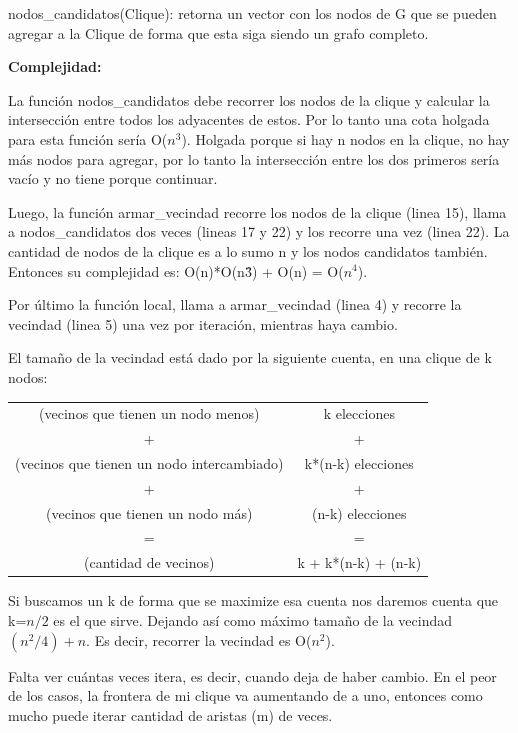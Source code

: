 nodos\_candidatos(Clique): retorna un vector con los nodos de G que se pueden agregar a la Clique de forma que esta siga siendo un grafo completo.

\textbf{Complejidad: }

La función nodos\_candidatos debe recorrer los nodos de la clique y calcular la intersección entre todos los adyacentes de estos. Por lo tanto una cota holgada para esta función sería O($n^3$). 
Holgada porque si hay n nodos en la clique, no hay más nodos para agregar, por lo tanto la intersección entre los dos primeros sería vacío y no tiene porque continuar.

Luego, la función armar\_vecindad recorre los nodos de la clique (linea 15), llama a nodos\_candidatos dos veces (lineas 17 y 22) y los recorre una vez (linea 22). 
La cantidad de nodos de la clique es a lo sumo n y los nodos candidatos también. Entonces su complejidad es: O(n)*O(n\^{3}) + O(n) = O($n^4$).

Por último la función local, llama a armar\_vecindad (linea 4) y recorre la vecindad (linea 5) una vez por iteración, mientras haya cambio.

El tamaño de la vecindad está dado por la siguiente cuenta, en una clique de k nodos:

\begin{center}
\begin{tabular}{  c  c  }
(vecinos que tienen un nodo menos) & k elecciones
\\ + & + \\ 
(vecinos que tienen un nodo intercambiado) & k*(n-k) elecciones
\\ + & + \\ 
(vecinos que tienen un nodo más) & (n-k) elecciones
\\ = & = \\
(cantidad de vecinos) & k + k*(n-k) + (n-k)
\end{tabular}
\end{center}

Si buscamos un k de forma que se maximize esa cuenta nos daremos cuenta que k=$n/2$ es el que sirve. Dejando así como máximo tamaño de la vecindad $(n^2/4) +n$. Es decir, recorrer la vecindad es O($n^2$).

Falta ver cuántas veces itera, es decir, cuando deja de haber cambio. En el peor de los casos, la frontera de mi clique va aumentando de a uno, entonces como mucho puede iterar cantidad de aristas (m) de veces.

